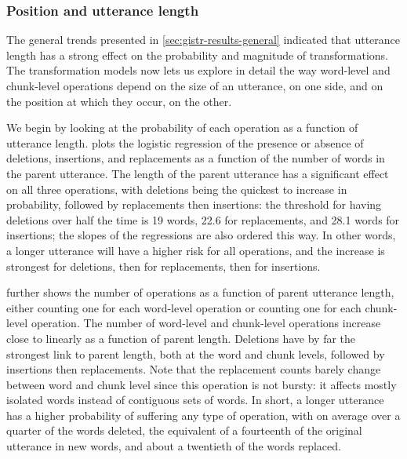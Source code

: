 \subsubsection{Position and utterance
length}\label{position-and-utterance-length}

The general trends presented in \cref{sec:gistr-results-general}
indicated that utterance length has a strong effect on the probability
and magnitude of transformations. The transformation models now lets us
explore in detail the way word-level and chunk-level operations depend
on the size of an utterance, on one side, and on the position at which
they occur, on the other.

We begin by looking at the probability of each operation as a function
of utterance length.  plots the logistic
regression of the presence or absence of deletions, insertions, and
replacements as a function of the number of words in the parent
utterance. The length of the parent utterance has a significant effect
on all three operations, with deletions being the quickest to increase
in probability, followed by replacements then insertions: the threshold
for having deletions over half the time is 19 words, 22.6 for
replacements, and 28.1 words for insertions; the slopes of the
regressions are also ordered this way. In other words, a longer
utterance will have a higher risk for all operations, and the increase
is strongest for deletions, then for replacements, then for insertions.

 further shows the number of operations as a
function of parent utterance length, either counting one for each
word-level operation or counting one for each chunk-level operation. The
number of word-level and chunk-level operations increase close to
linearly as a function of parent length. Deletions have by far the
strongest link to parent length, both at the word and chunk levels,
followed by insertions then replacements. Note that the replacement
counts barely change between word and chunk level since this operation
is not bursty: it affects mostly isolated words instead of contiguous
sets of words. In short, a longer utterance has a higher probability of
suffering any type of operation, with on average over a quarter of the
words deleted, the equivalent of a fourteenth of the original utterance
in new words, and about a twentieth of the words replaced.

